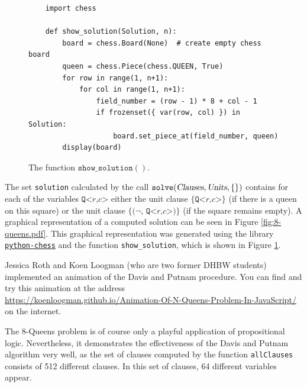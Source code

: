 \begin{figure}[!ht]
\centering
\begin{verbatim}
    import chess
                
    def show_solution(Solution, n):
        board = chess.Board(None)  # create empty chess board
        queen = chess.Piece(chess.QUEEN, True)
        for row in range(1, n+1):
            for col in range(1, n+1):
                field_number = (row - 1) * 8 + col - 1
                if frozenset({ var(row, col) }) in Solution:
                    board.set_piece_at(field_number, queen)
        display(board)        
\end{verbatim}
\vspace*{-0.3cm}
\caption{The function $\texttt{show\_solution}()$.}
\label{fig:printBoard}
\end{figure}

The set \texttt{solution} calculated by the call $\texttt{solve}(\textsl{Clauses}, \textsl{Units}, \{\})$ contains for each of the variables $\texttt{Q<}r\texttt{,}c\texttt{>}$
either the unit clause $\{\texttt{Q<}r\texttt{,}c\texttt{>}\}$ (if there is a queen on this square) or
the unit clause $\{ \texttt{(¬, Q<}r\texttt{,}c\texttt{>)}\}$ (if the square remains empty).
A graphical representation of a computed solution can be seen in Figure \ref{fig:8-queens.pdf}.
This graphical representation was generated using the library
\href{https://python-chess.readthedocs.io/en/latest/}{\texttt{python-chess}} and the function
\texttt{show\_solution}, which is shown in Figure \ref{fig:printBoard}.

Jessica Roth and Koen Loogman (who are two former DHBW students) implemented an animation of the Davis and Putnam procedure. You can find and try this animation at the address
\\[0.2cm]
\hspace*{1.3cm}
\href{https://koenloogman.github.io/Animation-Of-N-Queens-Problem-In-JavaScript/}{https://koenloogman.github.io/Animation-Of-N-Queens-Problem-In-JavaScript/}
\\[0.2cm]
on the internet.

The 8-Queens problem is of course only a playful application of propositional logic.
Nevertheless, it demonstrates the effectiveness of the Davis and Putnam algorithm very well, as the set of clauses computed by the function \texttt{allClauses}
consists of 512 different clauses. In this set of clauses, 64 different
variables appear.

